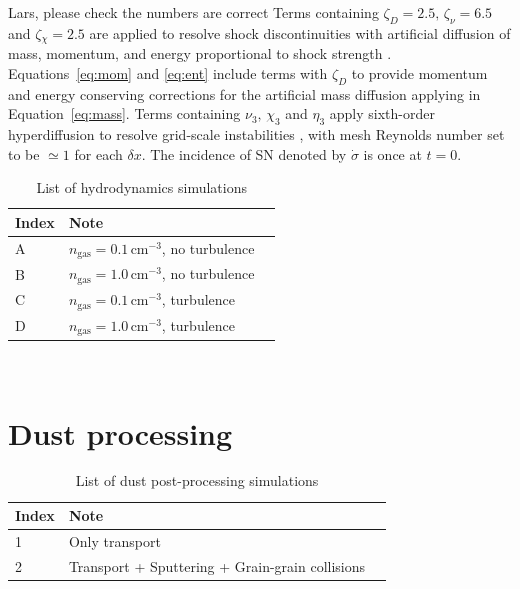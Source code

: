 \documentclass[fleqn,usenatbib]{mnras}
\newcommand{\fg}[1]{\textcolor{mypurple}{#1}}
\newcommand\dx{ {\delta x}}
\begin{document}
 \fg{Lars, please check the numbers are correct}
 Terms containing $\zeta_D{=2.5},\,\zeta_\nu{=6.5}$ and $\zeta{_\chi=2.5}$
 are applied to resolve shock discontinuities with artificial diffusion of
 mass, momentum, and energy proportional to shock strength
 \citep[see][for details]{GMKSH20}.
 Equations~\eqref{eq:mom} and \eqref{eq:ent} include terms with $\zeta_D$
 to provide momentum and energy conserving corrections for the
 artificial mass diffusion applying in Equation~\eqref{eq:mass}.
 Terms containing $\nu_3,\,\chi_3$ and $\eta_3$ apply sixth-order hyperdiffusion
 to resolve grid-scale instabilities \citep[see, e.g.,][]{ABGS02,HB04,GMKS21},
 with mesh Reynolds number set to be $\simeq1$ for each $\dx$.
 The incidence of SN denoted by $\dot\sigma$ is once at $t=0$.


 \begin{table}
 \centering
 \caption{List of hydrodynamics simulations}
 \begin{tabular}{ l l l}
 \hline\hline
 Index&Note&\\\hline 
 A&$n_\text{gas}=0.1\,\text{cm}^{-3}$, no turbulence&\\\hline  
 B&$n_\text{gas}=1.0\,\text{cm}^{-3}$, no turbulence&\\\hline   
 C&$n_\text{gas}=0.1\,\text{cm}^{-3}$, turbulence&\\\hline  
 D&$n_\text{gas}=1.0\,\text{cm}^{-3}$, turbulence&\\\hline   
 \end{tabular}
 \label{List_hydrosimulations}
 \end{table}

\newpage~
\newpage
\section{Dust processing}
 \begin{table}
 \centering
 \caption{List of dust post-processing simulations}
 \begin{tabular}{ l l l}
 \hline\hline
 Index&Note&\\\hline 
 1&Only transport&\\\hline  
 2&Transport + Sputtering + Grain-grain collisions&\\\hline 
 \end{tabular}
 \label{List_Dustsimulations}
 \end{table}
 
\end{document}
